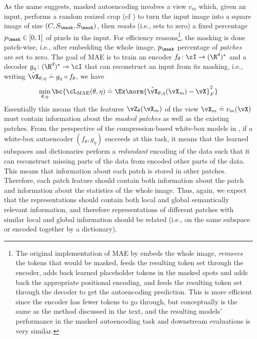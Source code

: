 \documentclass[../../book-main.tex]{subfiles}
\begin{document}
As the name suggests, masked autoencoding involves a view \(v_{m}\)
which, given an input, performs a random resized crop (cf
) to turn the input image
into a square image of size \((C, S_{\mask}, S_{\mask})\), then
\textit{masks} (i.e., sets to zero) a fixed percentage \(p_{\mask}
\in [0, 1]\) of pixels in the input. For efficiency
reasons\footnote{The original implementation of MAE by
\cite{he2022masked} embeds the whole image, \textit{removes} the
tokens that would be masked, feeds the resulting token set through
the encoder, adds back learned placeholder tokens in the masked spots
and adds back the appropriate positional encoding, and feeds the
resulting token set through the decoder to get the autoencoding
prediction. This is more efficient since the encoder has fewer tokens
to go through, but conceptually is the same as the method discussed
in the text, and the resulting models' performance in the masked
autoencoding task and downstream evaluations is very similar.}, the
masking is done patch-wise, i.e.,  after embedding the whole image,
\(p_{\mask}\) percentage of \textit{patches} are set to zero. The
goal of MAE is to train an encoder \(f_{\theta} \colon \cI \to
(\R^{d})^{*}\) and a decoder \(g_{\eta} \colon (\R^{d})^{*} \to \cI\)
that can reconstruct an input from its masking, i.e., writing
\(\hat{\vX}_{\theta, \eta} \doteq g_{\eta} \circ f_{\theta}\), we have
\begin{equation}
\min_{\theta, \eta}\bc{\cL_{\mathrm{MAE}}(\theta, \eta) \doteq
\Ex\norm{\hat{\vX}_{\theta, \eta}(\vX_{m}) - \vX}_{F}^{2}}
\end{equation}
Essentially this means that the features \(\vZ_{\theta}(\vX_{m})\) of
the view \(\vX_{m} \doteq v_{m}(\vX)\) must contain information about
the \textit{masked patches} as well as the existing patches. From the
perspective of the compression-based white-box models in
, if a white-box autoencoder  \((f_{\theta},
g_{\eta})\) succeeds at this task, it means that the learned
subspaces and dictionaries perform a \textit{redundant} encoding of
the data such that it can reconstruct missing parts of the data from
encoded other parts of the data. This means that information about
each patch is stored in other patches. Therefore, each patch feature
should contain both information about the patch and information about
the statistics of the whole image. Thus, again, we expect that the
representations should contain both local and global semantically
relevant information, and therefore representations of different
patches with similar local and global information should be related
(i.e., on the same subspace or encoded together by a dictionary).
\end{document}

